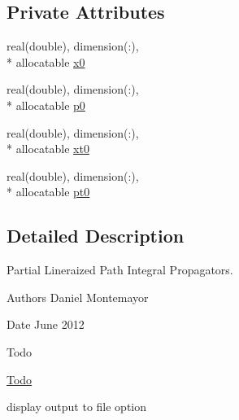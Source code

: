 \subsection*{Private Attributes}
\begin{DoxyCompactItemize}
\item 
real(double), dimension(\-:), \\*
allocatable \hyperlink{classpldm__class_a66ae11e24219b080698059a797561bb4}{x0}
\item 
real(double), dimension(\-:), \\*
allocatable \hyperlink{classpldm__class_a4da9c01c7e463087a5f38764804dd0eb}{p0}
\item 
real(double), dimension(\-:), \\*
allocatable \hyperlink{classpldm__class_a2f8d09296fcb6d486fb5a87e5a13276b}{xt0}
\item 
real(double), dimension(\-:), \\*
allocatable \hyperlink{classpldm__class_a6f0729e807a28fab99053667439c375c}{pt0}
\end{DoxyCompactItemize}


\subsection{Detailed Description}
Partial Lineraized Path Integral Propagators. 

\begin{DoxyAuthor}{Authors}
Daniel Montemayor 
\end{DoxyAuthor}
\begin{DoxyDate}{Date}
June 2012 
\end{DoxyDate}
\begin{DoxyRefDesc}{Todo}
\item[\hyperlink{todo__todo000003}{Todo}]
\begin{DoxyItemize}
\item display output to file option 
\end{DoxyItemize}\end{DoxyRefDesc}


